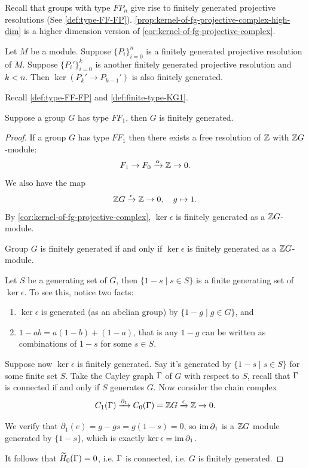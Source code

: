 Recall that groups with type \(FP_n\) give rise to finitely generated projective resolutions (See \cref{def:type-FF-FP}).
\cref{prop:kernel-of-fg-projective-complex-high-dim} is a higher dimension version of \cref{cor:kernel-of-fg-projective-complex}.


\begin{proposition}
    \label{prop:kernel-of-fg-projective-complex-high-dim}
    Let \(M\) be a module. Suppose \(\{P_i\}_{i=0}^n\) is a finitely generated projective resolution of \(M\). Suppose \(\{P_i'\}_{i=0}^k\) is another finitely generated projective resolution and \(k<n\). Then \(\ker (P_k' \to P_{k-1}')\) is also finitely generated.
\end{proposition}

Recall \cref{def:type-FF-FP} and \cref{def:finite-type-KG1}.

\begin{lemma}
    \label{lem:FF1-implies-F1}
    Suppose a group \(G\) has type 
    \(FF_1\), then \(G\) is finitely generated.
\end{lemma}
\begin{proof}
    If a group \(G\)  has type   \(FF_1\) then there exists a free resolution  of \(\mathbb{Z}\) with \(\mathbb{Z} G\)-module:
    \[ F_1 \to F_0\xrightarrow{\alpha} \mathbb{Z} \to 0.\]
    We also have the map 
    \[\mathbb{Z} G \xrightarrow{\epsilon} \mathbb{Z} \to 0, \quad g\mapsto 1.\]
    By \cref{cor:kernel-of-fg-projective-complex}, \(\ker \epsilon\) is finitely generated as a \(\mathbb{Z} G\)-module.

    
    \begin{claim}
        Group \(G\) is finitely generated if and only if \(\ker \epsilon\) is finitely generated as a \(\mathbb{Z} G\)-module.
    \end{claim}
    
    Let \(S\) be a generating set of \(G\), then \(\{1-s\mid s\in S\}\) is a finite generating set of \(\ker \epsilon\). To see this, notice two facts:
    \begin{enumerate}
        \item \(\ker \epsilon\) is generated (as an abelian group) by \(\{1-g \mid g\in G\}\), and
        \item \(1-ab = a(1-b)+(1-a)\), that is any \(1-g\) can be written as combinations of \(1-s\) for some \(s\in S\). 
    \end{enumerate}

    
    Suppose now \(\ker \epsilon\) is finitely generated. Say it's generated by \(\{1-s \mid s\in S\}\) for some finite set \(S\).
    Take the Cayley graph \(\Gamma\) of \(G\) with respect to \(S\), recall that \(\Gamma\) is connected if and only if \(S\) generates \(G\). Now consider the chain complex
    \[ C_1 (\Gamma) \xrightarrow{\partial_1} C_0 (\Gamma) =\mathbb{Z} G \xrightarrow{\epsilon} \mathbb{Z} \to 0 .\]
    
    We verify that \(\partial_1 (e) = g-gs = g(1-s) =0\), so \(\operatorname{im} \partial_1\) is a \(\mathbb{Z} G\) module generated by \(\{1-s\}\), which is exactly \(\ker \epsilon = \operatorname{im} \partial_1\).

    It follows that \(\widetilde H_0(\Gamma)=0\), i.e. \(\Gamma\) is connected, i.e. \(G\) is finitely generated.
\end{proof}

